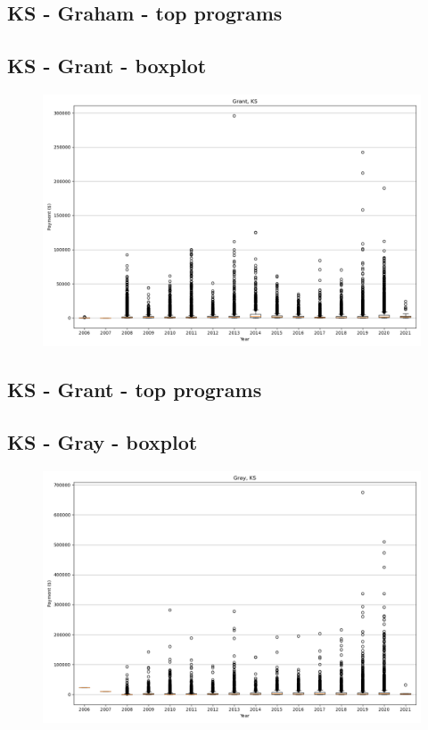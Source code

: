 \subsection*{KS - Graham - top programs}

\newpage
\subsection*{KS - Grant - boxplot}
\begin{figure}[h]
\centering
\includegraphics[width=7in]{../output/boxplots/counties/Grant-KS_boxplot.png}
\end{figure}


\subsection*{KS - Grant - top programs}

\newpage
\subsection*{KS - Gray - boxplot}
\begin{figure}[h]
\centering
\includegraphics[width=7in]{../output/boxplots/counties/Gray-KS_boxplot.png}
\end{figure}


